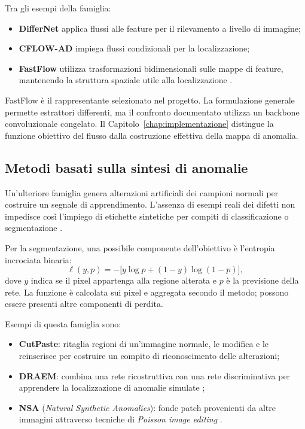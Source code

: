 Tra gli esempi della famiglia:
\begin{itemize}
    \item \textbf{DifferNet} applica flussi alle feature per il rilevamento a livello di immagine;
    \item \textbf{CFLOW-AD} impiega flussi condizionali per la localizzazione;
    \item \textbf{FastFlow} utilizza trasformazioni bidimensionali sulle mappe di feature, mantenendo la struttura spaziale utile alla localizzazione \cite{Yu_et_al._2021}.
\end{itemize}

FastFlow è il rappresentante selezionato nel progetto. La formulazione generale permette estrattori differenti, ma il confronto documentato utilizza un backbone convoluzionale congelato. Il Capitolo~\ref{chap:implementazione} distingue la funzione obiettivo del flusso dalla costruzione effettiva della mappa di anomalia.

\subsection{Metodi basati sulla sintesi di anomalie}

Un'ulteriore famiglia genera alterazioni artificiali dei campioni normali per costruire un segnale di apprendimento. L'assenza di esempi reali dei difetti non impedisce così l'impiego di etichette sintetiche per compiti di classificazione o segmentazione \cite{Cui_et_al._2023}.

Per la segmentazione, una possibile componente dell'obiettivo è l'entropia incrociata binaria:
\[
    \ell(y,p)=-\bigl[y\log p+(1-y)\log(1-p)\bigr],
\]
dove $y$ indica se il pixel appartenga alla regione alterata e $p$ è la previsione della rete. La funzione è calcolata sui pixel e aggregata secondo il metodo; possono essere presenti altre componenti di perdita.

Esempi di questa famiglia sono:
\begin{itemize}
    \item \textbf{CutPaste}: ritaglia regioni di un'immagine normale, le modifica e le reinserisce per costruire un compito di riconoscimento delle alterazioni;
    \item \textbf{DRAEM}: combina una rete ricostruttiva con una rete discriminativa per apprendere la localizzazione di anomalie simulate \cite{Zavrtanik_et_al._2021};
    \item \textbf{NSA} (\textit{Natural Synthetic Anomalies}): fonde patch provenienti da altre immagini attraverso tecniche di \textit{Poisson image editing} \cite{Cui_et_al._2023}.
\end{itemize}

